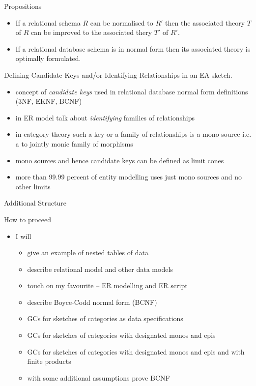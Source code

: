 \begin{frame}{Propositions}
\begin{itemize}
\item If a relational schema $R$ can be normalised to $R'$ then the associated theory $T$ of $R$ can be improved to the associated thery $T'$ of $R'$.

\item If a relational database schema is in normal form then its associated theory is optimally formulated.
\end{itemize}
\end{frame} 
\fi

\begin{frame}{Defining Candidate Keys and/or Identifying Relationships in an EA sketch.  }
\begin{itemize}
\item concept of \textit{candidate keys} used in relational database normal form definitions {\scriptsize (3NF, EKNF, BCNF)}
\item in ER model talk about \textit{identifying} families of relationships
\item in category theory such a key or a family of relationships is a mono source i.e. a to jointly monic family of morphisms
\item mono sources and hence candidate keys can be defined as limit cones
\item more than 99.99 percent of entity modelling uses just mono sources and no other limits
\end{itemize}
\end{frame}

\begin{frame}{Additional Structure}
\resizebox{11.3cm}{!}{

\featurelist
}
\end{frame}

\begin{frame}{How to proceed}
\begin{itemize}
\pause \item I will
\begin{itemize}
   \item give an example of nested tables of data
   \item describe relational model  and other data models 
   \pause \item touch on my favourite -- ER modelling and ER script
   \pause \item describe Boyce-Codd normal form (BCNF)
   \pause \item GCs for sketches of categories as data specifications 
   \pause \item GCs for sketches of categories with designated monos and epis
   \pause \item GCs for sketches of categories with designated monos and epis and with finite products
  \pause \item with some additional assumptions prove BCNF
\end{itemize}
\end{itemize}
\end{frame}

